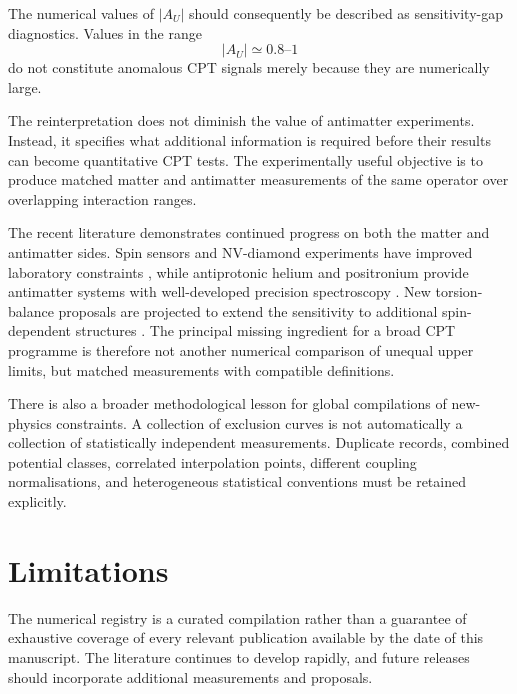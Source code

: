 \documentclass[aps,prd,reprint,superscriptaddress,nofootinbib]{revtex4-2}
\begin{document}
	The numerical values of $|A_U|$ should consequently be described as
	sensitivity-gap diagnostics. Values in the range
	\begin{equation}
		|A_U|\simeq0.8\text{--}1
	\end{equation}
	do not constitute anomalous CPT signals merely because they are
	numerically large.
	
	The reinterpretation does not diminish the value of antimatter
	experiments. Instead, it specifies what additional information is
	required before their results can become quantitative CPT tests.
	The experimentally useful objective is to produce matched matter and
	antimatter measurements of the same operator over overlapping
	interaction ranges.
	
	The recent literature demonstrates continued progress on both the
	matter and antimatter sides. Spin sensors and NV-diamond experiments
	have improved laboratory constraints \cite{Jiao2021,Liang2023,Jiang2025},
	while antiprotonic helium and positronium provide antimatter systems
	with well-developed precision spectroscopy
	\cite{Ficek2018,Adkins2022}. New torsion-balance proposals are projected to extend the sensitivity to additional spin-dependent structures \cite{Jin2026}. The principal missing ingredient for a broad CPT
	programme is therefore not another numerical comparison of unequal
	upper limits, but matched measurements with compatible definitions.
	
	There is also a broader methodological lesson for global compilations
	of new-physics constraints. A collection of exclusion curves is not
	automatically a collection of statistically independent measurements.
	Duplicate records, combined potential classes, correlated interpolation
	points, different coupling normalisations, and heterogeneous
	statistical conventions must be retained explicitly.
	
	\section{Limitations}
	
	The numerical registry is a curated compilation rather than a guarantee
	of exhaustive coverage of every relevant publication available by the
	date of this manuscript. The literature continues to develop rapidly,
	and future releases should incorporate additional measurements and
	proposals.
	
\end{document}
